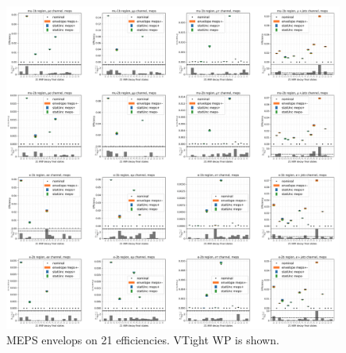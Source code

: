 \begin{figure}
    \centering
    \includegraphics[width=0.99\textwidth]{chapters/Appendix/sectionTTSyst/figures/meps.png}
    

    

    
    \caption{MEPS envelops on 21 efficiencies. VTight WP is shown.}
    \label{fig:appendix:reweighttt:effAfterCorrMEPS}
\end{figure}


